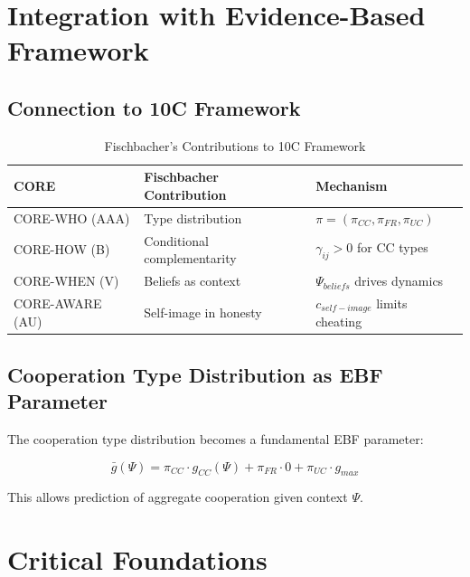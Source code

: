 \section{Integration with Evidence-Based Framework}

\subsection{Connection to 10C Framework}

\begin{table}[h]
\centering
\caption{Fischbacher's Contributions to 10C Framework}
\label{tab:fischbacher-9c}
\begin{tabular}{lll}
\toprule
\textbf{CORE} & \textbf{Fischbacher Contribution} & \textbf{Mechanism} \\
\midrule
CORE-WHO (AAA) & Type distribution & $\pi = (\pi_{CC}, \pi_{FR}, \pi_{UC})$ \\
CORE-HOW (B) & Conditional complementarity & $\gamma_{ij} > 0$ for CC types \\
CORE-WHEN (V) & Beliefs as context & $\Psi_{beliefs}$ drives dynamics \\
CORE-AWARE (AU) & Self-image in honesty & $c_{self-image}$ limits cheating \\
\bottomrule
\end{tabular}
\end{table}

\subsection{Cooperation Type Distribution as EBF Parameter}

The cooperation type distribution becomes a fundamental EBF parameter:

\begin{equation}
\bar{g}(\Psi) = \pi_{CC} \cdot g_{CC}(\Psi) + \pi_{FR} \cdot 0 + \pi_{UC} \cdot g_{max}
\end{equation}

This allows prediction of aggregate cooperation given context $\Psi$.

\section{Critical Foundations}

